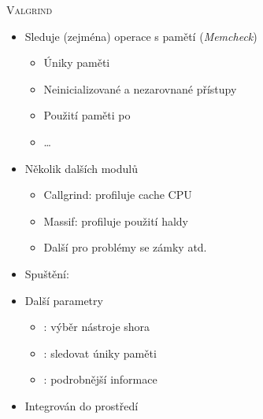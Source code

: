 
\begin{frame}{\textsc{Valgrind}}

  \begin{itemize}
    \item Sleduje (zejména) operace s pamětí (\emph{Memcheck})
    \begin{itemize}
      \item Úniky paměti
      \item Neinicializované a nezarovnané přístupy
      \item Použití paměti po 
      \item \dots
    \end{itemize}

    \pause

    \item Několik dalších modulů
    \begin{itemize}
      \item Callgrind: profiluje cache CPU
      \item Massif: profiluje použití haldy
      \item Další pro problémy se zámky atd.
    \end{itemize}

    \pause

    \item Spuštění: 
    \item Další parametry
    \begin{itemize}
      \item {}: výběr nástroje shora
      \item {}: sledovat úniky paměti
      \item {}: podrobnější informace
    \end{itemize}

    \iffimuni\else
      \item Integrován do prostředí \qtc
    \fi
  \end{itemize}

\end{frame}

